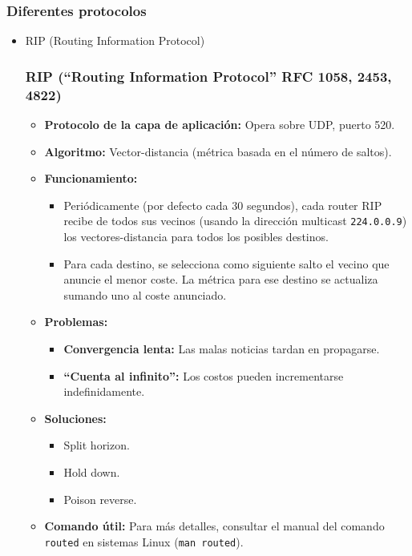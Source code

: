 \documentclass[a4paper,12pt]{article}
\begin{document}
\subsubsection*{Diferentes protocolos}

\begin{itemize}
    \item RIP (Routing Information Protocol)
    \subsubsection*{RIP (“Routing Information Protocol” RFC 1058, 2453, 4822)}

    \begin{itemize}
        \item \textbf{Protocolo de la capa de aplicación:} Opera sobre UDP, puerto 520.
        \item \textbf{Algoritmo:} Vector-distancia (métrica basada en el número de saltos).
        \item \textbf{Funcionamiento:}
        \begin{itemize}
            \item Periódicamente (por defecto cada 30 segundos), cada router RIP recibe de todos sus vecinos (usando la dirección multicast \texttt{224.0.0.9}) los vectores-distancia para todos los posibles destinos.
            \item Para cada destino, se selecciona como siguiente salto el vecino que anuncie el menor coste. La métrica para ese destino se actualiza sumando uno al coste anunciado.
        \end{itemize}
        \item \textbf{Problemas:}
        \begin{itemize}
            \item \textbf{Convergencia lenta:} Las malas noticias tardan en propagarse.
            \item \textbf{“Cuenta al infinito”:} Los costos pueden incrementarse indefinidamente.
        \end{itemize}
        \item \textbf{Soluciones:}
        \begin{itemize}
            \item Split horizon.
            \item Hold down.
            \item Poison reverse.
        \end{itemize}
        \item \textbf{Comando útil:} Para más detalles, consultar el manual del comando \texttt{routed} en sistemas Linux (\texttt{man routed}).
    \end{itemize}


\end{itemize}
\end{document}
